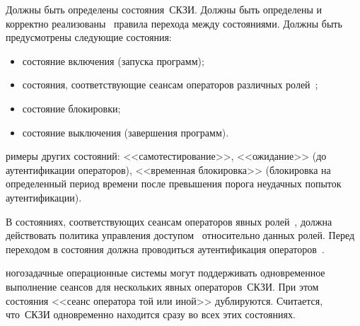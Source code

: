 \label{R.AC.States} %
Должны быть определены состояния~СКЗИ. Должны быть определены и 
корректно реализованы~ правила 
перехода между состояниями. Должны быть предусмотрены следующие состояния:
\begin{itemize}
\item
состояние включения (запуска программ);
\item
состояния, соответствующие сеансам операторов различных ролей~;
\item
состояние блокировки;
\item
состояние выключения (завершения программ).
\end{itemize}

\begin{note*}
римеры других состояний:
<<самотестирование>>,
<<ожидание>> (до аутентификации операторов),
<<временная блокировка>> (блокировка на определенный период времени
после превышения порога неудачных попыток аутентификации).
\end{note*}

\label{R.AC.OpStates} %
В состояниях, соответствующих сеансам операторов явных
ролей~, должна действовать политика управления 
доступом~ относительно данных ролей.
%
Перед переходом в состояния должна проводиться аутентификация
операторов~.

\begin{note*}
ногозадачные операционные системы могут поддерживать 
одновременное выполнение сеансов для нескольких явных операторов~СКЗИ.
При этом состояния <<сеанс оператора той или иной>> дублируются. 
Считается, что~СКЗИ одновременно находится сразу во всех этих состояниях. 
%
\end{note*}

